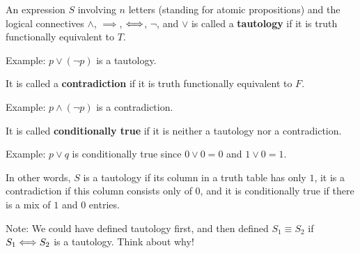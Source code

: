 \begin{definition}
	An expression $S$ involving $n$ letters (standing for atomic propositions) and the logical connectives $\wedge$, $\implies$, $\Longleftrightarrow$, $\neg$, and $\vee$ is called a \textbf{tautology} if it is truth functionally equivalent to $T$.  
	
	Example:  $p \vee (\neg p)$ is a tautology.
	
	It is called a \textbf{contradiction} if it is truth functionally equivalent to $F$.
	
	Example:  $p \wedge (\neg p)$ is a contradiction.
	
	It is called  \textbf{conditionally true} if it is neither a tautology nor a contradiction.
	
	Example:  $p \vee q$ is conditionally true since $0 \vee 0 = 0$ and $1 \vee 0 = 1$.
	
	In other words, $S$ is a tautology if its column in a truth table has only $1$, it is a contradiction if this column consists only of $0$, and it is conditionally true if there is a mix of $1$ and $0$ entries.
	
\end{definition}

Note:  We could have defined tautology first, and then defined $S_1 \equiv S_2$ if $S_1 \Longleftrightarrow S_2$ is a tautology.  Think about why!







